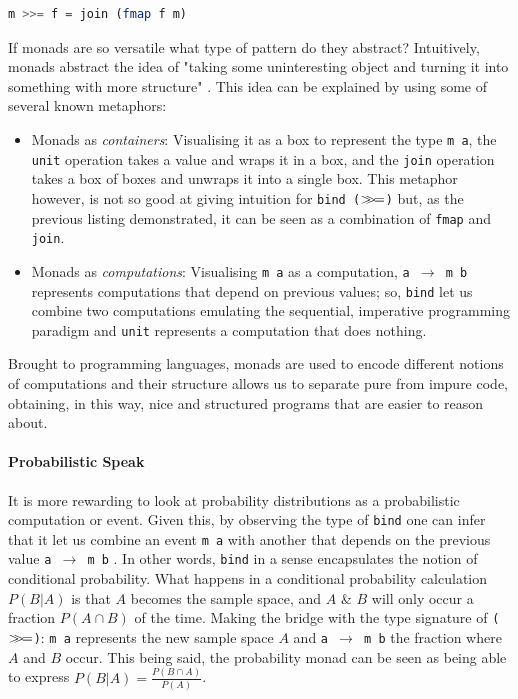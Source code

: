 \documentclass[
  oneside,
  11pt, a4paper,
  footinclude=true,
  headinclude=true,
  cleardoublepage=empty
]{scrbook}
\theoremstyle{definition}
\theoremstyle{definition}
\def\bind{\mathbin{{>\hskip-1ex>\hskip-.4ex=}}}
\begin{document}
	            \begin{lstlisting}[language=Haskell, caption={Relation between \texttt{join} and \texttt{bind}},captionpos=b]
                    m >>= f = join (fmap f m) 
	            \end{lstlisting}{}
	            
	            If monads are so versatile what type of pattern do they abstract? Intuitively, monads abstract the idea of "taking some uninteresting object and turning it into something with more structure" \citep{DBLP:journals/corr/abs-1803-10195}. This idea can be explained by using some of several known metaphors:
	            
	            \begin{itemize}
	                \item Monads as \emph{containers}: Visualising it as a box to represent the type \texttt{m a}, the \texttt{unit} operation takes a value and wraps it in a box, and the \texttt{join} operation takes a box of boxes and unwraps it into a single box. This metaphor however, is not so good at giving intuition for \texttt{bind ($\bind$)} but, as the previous listing demonstrated, it can be seen as a combination of \texttt{fmap} and \texttt{join}.
	                
	                \item Monads as \emph{computations}: Visualising \texttt{m a} as a computation, \texttt{a $\rightarrow$ m b} represents computations that depend on previous values; so, \texttt{bind} let us combine two computations emulating the sequential, imperative programming paradigm and \texttt{unit} represents a computation that does nothing.
	            \end{itemize}{}
	            
	            Brought to programming languages, monads are used to encode different notions of computations and their structure allows us to separate pure from impure code, obtaining, in this way, nice and structured programs that are easier to reason about. 
	            
	 \paragraph{Probabilistic Speak}
	            
	It is more rewarding to look at probability distributions as a probabilistic computation or event. Given this, by observing the type of \texttt{bind} one can infer that it let us combine an event \texttt{m a} with another that depends on the previous value \texttt{a $\rightarrow$ m b} \citep{erwig_kollmansberger_2006}. In other words, \texttt{bind} in a sense encapsulates the notion of conditional probability. What happens in a conditional probability calculation $P(B|A)$ is that $A$ becomes the sample space, and $A$ \& $B$ will only occur a fraction $P(A \cap B)$ of the time. Making the bridge with the type signature of \texttt{($\bind$)}: \texttt{m a} represents the new sample space $A$ and \texttt{a $\rightarrow$ m b} the fraction where $A$ and $B$ occur. This being said, the probability monad can be seen as being able to express $P(B|A) = \frac{P(B \cap A)}{P(A)}$. 
	            
\end{document}
